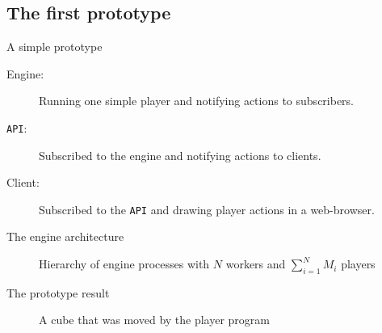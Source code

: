 \documentclass{beamer}
\begin{document}
\subsection{The first prototype}
\begin{frame}{A simple prototype}
\begin{description}
\item[Engine:]
Running one simple player and notifying actions to subscribers.
\item[\texttt{API}:]
Subscribed to the engine and notifying actions to clients.
\item[Client:]
Subscribed to the \texttt{API} and drawing player actions in a web-browser.
\end{description}
\end{frame}
\begin{frame}{The engine architecture}
\begin{figure}[H]
\begin{center}
\noindent\resizebox{\textwidth}{!}{

}
\end{center}
\caption{Hierarchy of engine processes with $N$ workers and $\sum_{i=1}^N M_i$ players}
\label{engine_arch}
\end{figure}
\end{frame}
\begin{frame}{The prototype result}
\begin{figure}[H]
\begin{center}
\noindent{}
\end{center}
\caption{A cube that was moved by the player program}
\label{cube_movement}
\end{figure}
\end{frame}
\end{document}
